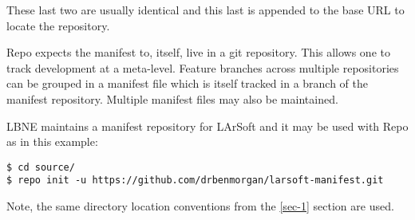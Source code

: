\documentclass[11pt]{article}
\begin{document}
These last two are usually identical and this last is appended to the base URL to locate the repository.  

Repo expects the manifest to, itself, live in a git repository.  This allows one to track development at a meta-level.  Feature branches across multiple repositories can be grouped in a manifest file which is itself tracked in a branch of the manifest repository.   Multiple manifest files may also be maintained.

LBNE maintains a manifest repository for LArSoft and it may be used with Repo as in this example:

\begin{verbatim}
$ cd source/
$ repo init -u https://github.com/drbenmorgan/larsoft-manifest.git
\end{verbatim}

Note, the same directory location conventions from the \ref{sec-1} section are used.
\end{document}
